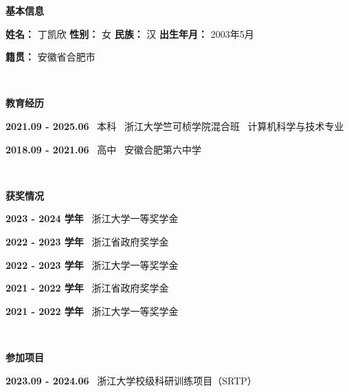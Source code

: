 \cleardoublepage
{}


\begin{large}
    \noindent \textbf{基本信息}
\end{large}

\noindent \textbf{姓名：} 丁凯欣 \quad\quad \textbf{性别：} 女 \quad\quad \textbf{民族：} 汉 \quad\quad \textbf{出生年月：} 2003年5月 

\noindent \textbf{籍贯：} 安徽省合肥市

\noindent ~

\begin{large}
    \noindent \textbf{教育经历}
\end{large}

\noindent \textbf{2021.09 - 2025.06} \, 本科 \, 浙江大学竺可桢学院混合班 \, 计算机科学与技术专业

\noindent \textbf{2018.09 - 2021.06} \, 高中 \, 安徽合肥第六中学

\noindent ~

\begin{large}
    \noindent \textbf{获奖情况}
\end{large}

\noindent \textbf{2023 - 2024 学年} \, 浙江大学一等奖学金

\noindent \textbf{2022 - 2023 学年} \, 浙江省政府奖学金

\noindent \textbf{2022 - 2023 学年} \, 浙江大学一等奖学金

\noindent \textbf{2021 - 2022 学年} \, 浙江省政府奖学金

\noindent \textbf{2021 - 2022 学年} \, 浙江大学一等奖学金


\noindent ~

\begin{large}
    \noindent \textbf{参加项目}
\end{large}

\noindent \textbf{2023.09 - 2024.06} \, 浙江大学校级科研训练项目（SRTP）